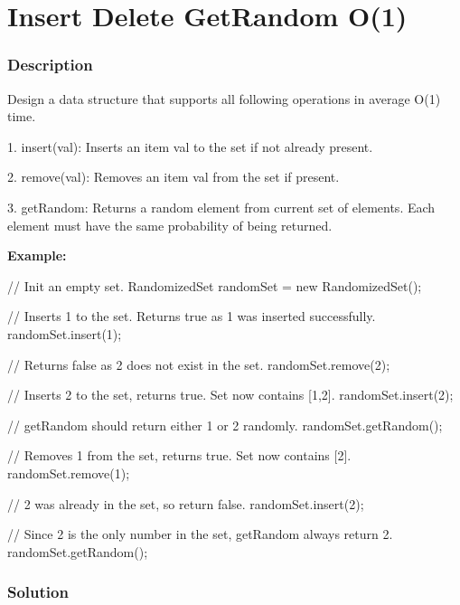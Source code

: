 \newpage

\section{Insert Delete GetRandom O(1)} %

\subsubsection{Description}
Design a data structure that supports all following operations in average O(1) time.

1. insert(val): Inserts an item val to the set if not already present.

2. remove(val): Removes an item val from the set if present.

3. getRandom: Returns a random element from current set of elements. Each element must have the same probability of being returned.

\textbf{Example:}

\begin{Code}
// Init an empty set.
RandomizedSet randomSet = new RandomizedSet();

// Inserts 1 to the set. Returns true as 1 was inserted successfully.
randomSet.insert(1);

// Returns false as 2 does not exist in the set.
randomSet.remove(2);

// Inserts 2 to the set, returns true. Set now contains [1,2].
randomSet.insert(2);

// getRandom should return either 1 or 2 randomly.
randomSet.getRandom();

// Removes 1 from the set, returns true. Set now contains [2].
randomSet.remove(1);

// 2 was already in the set, so return false.
randomSet.insert(2);

// Since 2 is the only number in the set, getRandom always return 2.
randomSet.getRandom();
\end{Code}

\newpage

\subsubsection{Solution}

